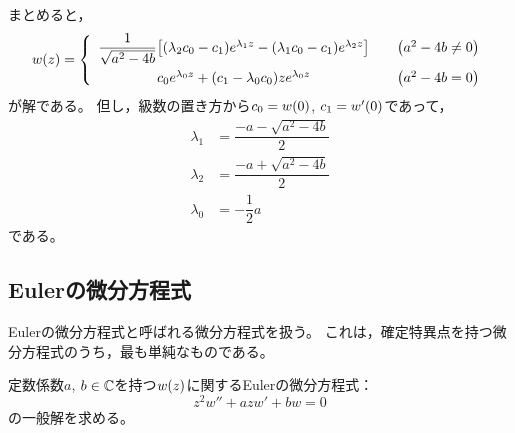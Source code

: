 \documentclass[a4paper,draft]{ltjsarticle}
\begin{document}
まとめると，
\begin{align}
    w\pare{z}=\case{
        \begin{array}{cl}
            \dfrac{1}{\sqrt{a^2-4b}}\squ{\pare{\lambda_2c_0-c_1}e^{\lambda_1 z}-\pare{\lambda_1 c_0-c_1}e^{\lambda_2 z}} & \quad\pare{a^2-4b\ne0}
            \vspace{4pt}                                                                                                                          \\
            c_0e^{\lambda_0 z}+\pare{c_1-\lambda_0c_0}ze^{\lambda_0 z}                                                   & \quad\pare{a^2-4b=0}
        \end{array}
    }
\end{align}
が解である。
但し，級数の置き方から$c_0=w\pare{0}$, $c_1=w'\pare{0}$であって，
\begin{align}
    \lambda_1 & =\dfrac{-a-\sqrt{a^2-4b}}{2}
    \\
    \lambda_2 & =\dfrac{-a+\sqrt{a^2-4b}}{2}
    \\
    \lambda_0 & =-\dfrac{1}{2}a
\end{align}
である。






\subsection{Eulerの微分方程式}
Eulerの微分方程式と呼ばれる微分方程式を扱う。
これは，確定特異点を持つ微分方程式のうち，最も単純なものである。

定数係数$a$, $b\in\mathbb{C}$を持つ$\fun{w}{z}$に関するEulerの微分方程式：
\begin{equation}
    \label{eq:ODE-9-2-1}
    z^2w''+azw'+bw=0
\end{equation}
の一般解を求める。
\end{document}
